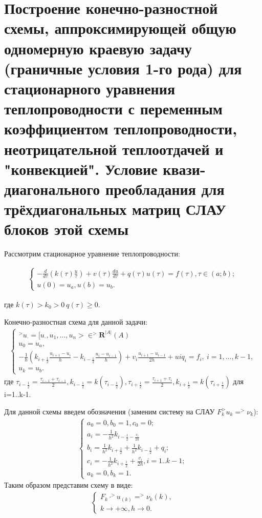 \documentclass[__main__.tex]{subfiles}
\begin{document}
\section{Построение конечно-разностной схемы, аппроксимирующей общую одномерную краевую задачу (граничные условия 1-го рода) для стационарного уравнения теплопроводности с переменным коэффициентом теплопроводности, неотрицательной теплоотдачей и "конвекцией". Условие квази-диагонального преобладания для трёхдиагональных матриц СЛАУ блоков этой схемы}

Рассмотрим стационарное уравнение теплопроводности:

\begin{gather}
	\begin{cases}
		-\frac{d}{d\tau}(k(\tau)\frac{u}{\tau})+v(\tau)\frac{du}{d\tau}+q(\tau)u(\tau)=f(\tau), \tau \in (a;b); \\
		u(0)=u_{a}, u(b)=u_{b}.
		\end{cases}
\end{gather}

где $k(\tau)>k_{0}>0 \  q(\tau) \geq 0.$

Конечно-разностная схема для данной задачи:
\begin{gather}
	\begin{cases}
		^>u_{\cdot}=[u_{\cdot}, u_{1},...,u_{n}>\in ^>\mathbf{R}^{|A|}(A)\\
		u_{0}=u_{a},\\
		-\frac{1}{h}(k_{i+\frac{1}{2}}\frac{u_{i+1}-u_{i}}{h}-k_{i-\frac{1}{2}}\frac{u_{i}-u_{i-1}}{h})+v_{i}\frac{u_{i+1}-u_{i-1}}{2h}+u{i}q_{i}=f_{i}, \ i=1,...,k-1,\\
		u_{k}=u_{b}.
	\end{cases}
\end{gather}
 где $\tau_{i-\frac{1}{2}}=\frac{\tau_{i-1}+\tau_{i-1}}{2}, k_{i-\frac{1}{2}}=k(\tau_{i-\frac{1}{2}}),\tau_{i+\frac{1}{2}}=\frac{\tau_{i+1}+\tau_{i}}{2}, k_{i+\frac{1}{2}}=k(\tau_{i+\frac{1}{2}})$ для i=1..k-1. 
 
 Для данной схемы введем обозначения (заменим систему на СЛАУ $F_{k} ^>u_{k}=^>\nu_{k}$):
 \\
 \begin{gather}
 	\begin{cases}
 		a_{0}=0, b_{0}=1,c_{0}=0;\\
 		a_{i}=-\frac{1}{h^2}k_{i-\frac{1}{2}-\frac{v_{i}}{2h}}\\
 		b_{i}=\frac{1}{h^2}k_{i+\frac{1}{2}}+\frac{1}{h^2}k_{i-\frac{1}{2}}+q_{i};\\
 		c_{i}=-\frac{1}{h^2}k_{i+\frac{1}{2}}+\frac{v_{i}}{2h}, i=1..k-1;\\
 		a_{k}=0, b_{k}=1.
 		\end{cases}
 	\end{gather}
 Таким образом представим схему в виде:\\
 \begin{gather}
 	\begin{cases}
 	F_{k}\cdot ^>u_{(k)}=^>\nu_{k}(k),\\
 	k\to +\infty , h\to0.
 	\end{cases}
 \end{gather}
 
\end{document}
